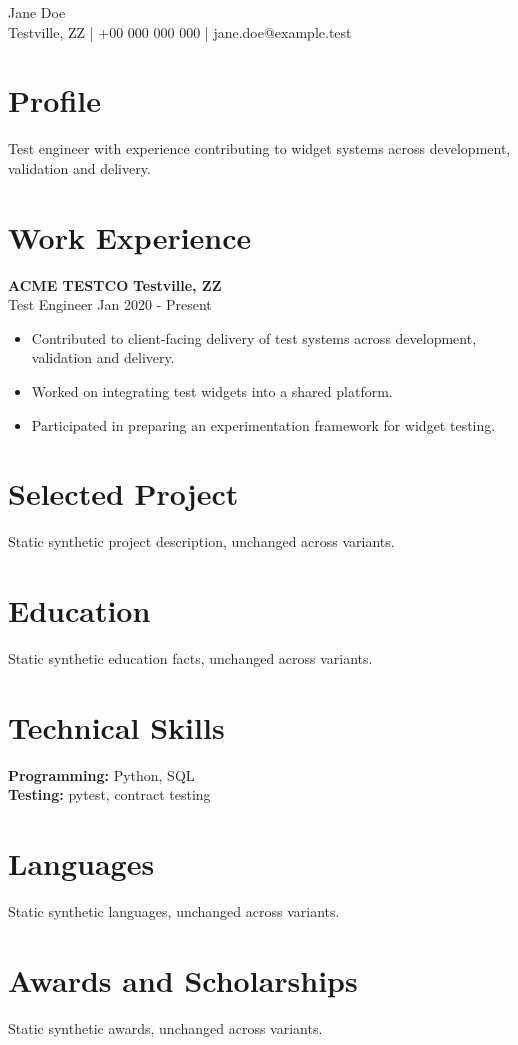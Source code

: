 \documentclass[10pt,a4paper]{article}
\newcommand{\header}[4]{
  \begin{center}
    {\LARGE #1}\\
    #2 \;|\; #3 \;|\; #4
  \end{center}
}
\newcommand{\entry}[5]{
  \textbf{#1} \hfill \textbf{#2}\\
  #3 \hfill #4\\[-2pt]
  #5
}
\newcommand{\skillrow}[2]{
  \textbf{#1:} #2\\[1pt]
}
\begin{document}
\header
  {Jane Doe}
  {Testville, ZZ}
  {+00 000 000 000}
  {jane.doe@example.test}

\section{Profile}
Test engineer with experience contributing to widget systems across development, validation and delivery.

\section{Work Experience}
\entry
  {ACME TESTCO}
  {Testville, ZZ}
  {Test Engineer}
  {Jan 2020 - Present}
  {
    \begin{itemize}
      \item Contributed to client-facing delivery of test systems across development, validation and delivery.
      \item Worked on integrating test widgets into a shared platform.
      \item Participated in preparing an experimentation framework for widget testing.
    \end{itemize}
  }

\section{Selected Project}
Static synthetic project description, unchanged across variants.

\section{Education}
Static synthetic education facts, unchanged across variants.

\section{Technical Skills}
\skillrow{Programming}{Python, SQL}
\skillrow{Testing}{pytest, contract testing}

\section{Languages}
Static synthetic languages, unchanged across variants.

\section{Awards and Scholarships}
Static synthetic awards, unchanged across variants.
\end{document}
